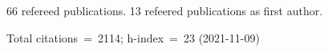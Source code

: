 66 refereed publications. 13 refeered publications as first author.

Total citations~=~2114; h-index~=~23 (2021-11-09)